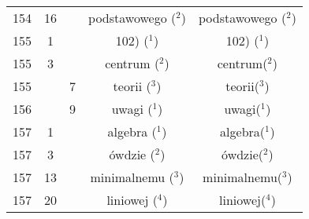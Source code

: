 \documentclass[a4paper,11pt]{article}
\numberwithin{equation}{section}
\begin{document}
\begin{center}
\begin{tabular}{|c|c|c|c|c|}
    154 & 16 & & podstawowego ($^{ 2 }$) & podstawowego ($^{ 2 }$) \\
    155 &  1 & & 102) ($^{ 1 }$) & 102) ($^{ 1 }$) \\
    155 &  3 & & centrum ($^{ 2 }$) & centrum($^{ 2 }$) \\
    155 & &  7 & teorii ($^{ 3 }$) & teorii($^{ 3 }$) \\
    156 & &  9 & uwagi ($^{ 1 }$) & uwagi($^{ 1 }$) \\
    157 &  1 & & algebra ($^{ 1 }$) & algebra($^{ 1 }$) \\
    157 &  3 & & ówdzie ($^{ 2 }$) & ówdzie($^{ 2 }$) \\
    157 & 13 & & minimalnemu ($^{ 3 }$) & minimalnemu($^{ 3 }$) \\
    157 & 20 & & liniowej ($^{ 4 }$) & liniowej($^{ 4 }$) \\
    \hline
  \end{tabular}





  \newpage


\end{center}
\end{document}
